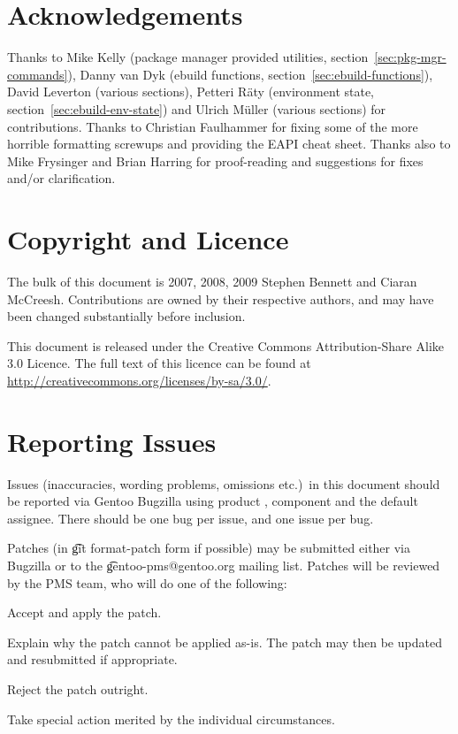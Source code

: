 \section*{Acknowledgements}

Thanks to Mike Kelly (package manager provided utilities,
section~\ref{sec:pkg-mgr-commands}), Danny van Dyk (ebuild functions,
section~\ref{sec:ebuild-functions}), David Leverton (various
sections), Petteri Räty (environment state,
section~\ref{sec:ebuild-env-state}) and Ulrich Müller (various
sections) for contributions. Thanks to Christian Faulhammer for fixing
some of the more horrible formatting screwups and providing the EAPI
cheat sheet. Thanks also to Mike Frysinger and Brian Harring for
proof-reading and suggestions for fixes and/or clarification.

\section*{Copyright and Licence}

The bulk of this document is \textcopyright{} 2007, 2008, 2009 Stephen Bennett and Ciaran McCreesh.
Contributions are owned by their respective authors, and may have been changed substantially before
inclusion.

This document is released under the Creative Commons Attribution-Share Alike 3.0 Licence. The full
text of this licence can be found at \url{http://creativecommons.org/licenses/by-sa/3.0/}.

\section*{Reporting Issues}

Issues (inaccuracies, wording problems, omissions etc.)\ in this document should be reported via
Gentoo Bugzilla using product , component  and the default
assignee. There should be one bug per issue, and one issue per bug.

Patches (in \t{git format-patch} form if possible) may be submitted either via Bugzilla or to the
\t{gentoo-pms@gentoo.org} mailing list. Patches will be reviewed by the PMS team, who will do one of
the following:

\begin{compactitem}
\item Accept and apply the patch.
\item Explain why the patch cannot be applied as-is. The patch may then be updated and resubmitted
if \mbox{appropriate}.
\item Reject the patch outright.
\item Take special action merited by the individual circumstances.
\end{compactitem}

